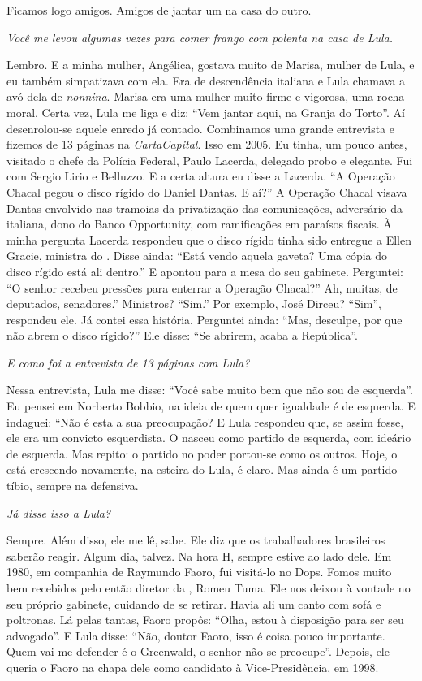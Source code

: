 \normalfont 
Ficamos logo amigos. Amigos de jantar um na casa do
outro.

\itshape
 Você me levou algumas vezes para comer frango com
polenta na casa de Lula.

\normalfont 
Lembro. E a minha mulher, Angélica, gostava muito de
Marisa, mulher de Lula, e eu também simpatizava com ela. Era de
descendência italiana e Lula chamava a avó dela de \emph{nonnina}.
Marisa era uma mulher muito firme e vigorosa, uma rocha moral. Certa
vez, Lula me liga e diz: ``Vem jantar aqui, na Granja do Torto''. Aí
desenrolou-se aquele enredo já contado. Combinamos uma grande entrevista
e fizemos de 13 páginas na \emph{CartaCapital}. Isso em 2005. Eu tinha,
um pouco antes, visitado o chefe da Polícia Federal, Paulo Lacerda,
delegado probo e elegante. Fui com Sergio Lirio e Belluzzo. E a certa
altura eu disse a Lacerda. ``A Operação Chacal pegou o disco rígido do
Daniel Dantas. E aí?'' A Operação Chacal visava Dantas envolvido nas
tramoias da privatização das comunicações, adversário da  italiana,
dono do Banco Opportunity, com ramificações em paraísos fiscais. À minha
pergunta Lacerda respondeu que o disco rígido tinha sido entregue a
Ellen Gracie, ministra do . Disse ainda: ``Está vendo aquela gaveta?
Uma cópia do disco rígido está ali dentro.'' E apontou para a mesa do
seu gabinete. Perguntei: ``O senhor recebeu pressões para enterrar a
Operação Chacal?'' Ah, muitas, de deputados, senadores.'' Ministros?
``Sim.'' Por exemplo, José Dirceu? ``Sim'', respondeu ele. Já contei
essa história. Perguntei ainda: ``Mas, desculpe, por que não abrem o
disco rígido?'' Ele disse: ``Se abrirem, acaba a República''.

\itshape
 E como foi a entrevista de 13 páginas com Lula?

\normalfont 
Nessa entrevista, Lula me disse: ``Você sabe muito bem
que não sou de esquerda''. Eu pensei em Norberto Bobbio, na ideia de
quem quer igualdade é de esquerda. E indaguei: ``Não é esta a sua
preocupação? E Lula respondeu que, se assim fosse, ele era um convicto
esquerdista. O  nasceu como partido de esquerda, com ideário de
esquerda. Mas repito: o partido no poder portou-se como os outros. Hoje,
o  está crescendo novamente, na esteira do Lula, é claro. Mas ainda é
um partido tíbio, sempre na defensiva.

\itshape
 Já disse isso a Lula?

\normalfont 
Sempre. Além disso, ele me lê, sabe. Ele diz que os
trabalhadores brasileiros saberão reagir. Algum dia, talvez. Na hora H,
sempre estive ao lado dele. Em 1980, em companhia de Raymundo Faoro, fui
visitá-lo no Dops. Fomos muito bem recebidos pelo então diretor da ,
Romeu Tuma. Ele nos deixou à vontade no seu próprio gabinete, cuidando
de se retirar. Havia ali um canto com sofá e poltronas. Lá pelas tantas,
Faoro propôs: ``Olha, estou à disposição para ser seu advogado''. E Lula
disse: ``Não, doutor Faoro, isso é coisa pouco importante. Quem vai me
defender é o Greenwald, o senhor não se preocupe''. Depois, ele queria o
Faoro na chapa dele como candidato à Vice-Presidência, em 1998.

